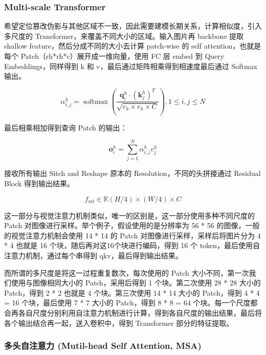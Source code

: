 \subsubsection{Multi-scale Transformer}

希望定位篡改伪影与其他区域不一致，因此需要建模长期关系，计算相似度，引入多尺度的 Transformer，来覆盖不同大小的区域。输入图片再 backbone 提取 shallow feature，然后分成不同的大小去计算 patch-wise 的 self attention，也就是每个 Patch（rh*rh*c）展开成一维向量，使用 FC 层 embed 到 Query Embeddings，同样得到 k 和 v，最后通过矩阵相乘得到相速度最后通过 Softmax 输出。

$$
\alpha_{i, j}^{h}=\operatorname{softmax}\left(\frac{\boldsymbol{q}_{i}^{h} \cdot\left(\boldsymbol{k}_{j}^{h}\right)^{T}}{\sqrt{r_{h} \times r_{h} \times C}}\right), 1 \leq i, j \leq N
$$

最后相乘相加得到查询 Patch 的输出：

$$
\boldsymbol{o}_{i}^{h}=\sum_{j=1}^{N} \alpha_{i, j}^{h} v_{j}^{h}
$$

接收所有输出 Sitch and Reshape 原本的 Resolution，不同的头拼接通过 Residual Block 得到输出结果。

$$
f_{m t} \in \mathbb{R}(H / 4) \times(W / 4) \times C
$$

这一部分与视觉注意力机制类似，唯一的区别是，这一部分使用多种不同尺度的 Patch 对图像进行采样。举个例子，假设使用的是分辨率为 56 * 56 的图像，一般的视觉注意力机制会使用 14 * 14 的 Patch 对图像进行采样，采样后将图片分为 4 * 4 也就是 16 个块，随后再对这16个块进行编码，得到 16 个 token，最后使用自注意力机制，通过每个串得到 qkv，最后得到输出结果。

而所谓的多尺度是将这一过程重复数次，每次使用的 Patch 大小不同，第一次我们使用与图像相同大小的 Patch，采用后得到 1 个块。第二次使用 28 * 28 大小的 Patch，得到 2 * 2 也就是 4 个块。第三次使用 14 * 14 大小的 Patch，得到 4 * 4 = 16 个块，最后使用 7 * 7 大小的 Patch，得到 8 * 8 = 64 个块。每一个尺度都会再各自尺度分别利用自注意力机制进行计算，得到各自尺度的输出结果，最后将各个输出结合再一起，送入卷积中，得到 Transformer 部分的特征提取。


\subsubsection{多头自注意力 (Mutil-head Self Attention, MSA)}

